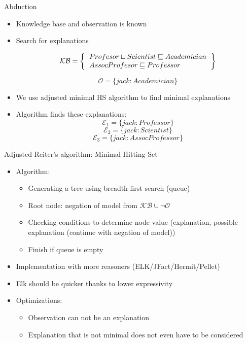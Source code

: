 \documentclass{beamer}
\begin{document}
\begin{frame}{Abduction}
	\begin{itemize}
		
		\item {
			Knowledge base and observation is known
		}
		
		\item {
			Search for explanations
		}
		
		\[ 
		\mathcal{KB} = \left\{
		\begin{tabular}{l c}
		$Profesor \sqcup Scientist \sqsubseteq Academician$ \\
		$AssocProfesor \sqsubseteq Professor$ \\
		\end{tabular}
		\right \}
		\]
		
		\[ \mathcal{O} = \{ jack: Academician \} \]
		
		\item {
			We use adjusted minimal HS algorithm to find minimal explanations
		}
		
		\item {
			Algorithm finds these explanations: 
			\[ \mathcal{E}_{1} = \{ jack: Professor \} \]
			\[ \mathcal{E}_{2} = \{ jack: Scientist \} \]
			\[ \mathcal{E}_{3} = \{ jack: AssocProfessor \} \]
		}
	\end{itemize}
\end{frame}

\begin{frame}{Adjusted Reiter's algorithm: Minimal Hitting Set}
	\begin{itemize}
		\item {
			Algorithm:
			
			\begin{itemize}
				\item {
					Generating a tree using breadth-first search (queue)
				}
				\item {
					Root node: negation of model from $\mathcal{KB} \cup \neg \mathcal{O}$
				}
				\item {
					Checking conditions to determine node value (explanation, possible explanation (continue with negation of model))
				}
				\item {
					Finish if queue is empty
				}
			\end{itemize}
		}
		\item {
			Implementation with more reasoners (ELK/JFact/Hermit/Pellet)
		}
		
		\item {
			Elk should be quicker thanks to lower expressivity
		}
		
		\item {
			Optimizations: 
			
			\begin{itemize}
				\item Observation can not be an explanation
				
				\item Explanation that is not minimal does not even have to be considered
			\end{itemize}
		}
		
	\end{itemize}
\end{frame}
\end{document}
